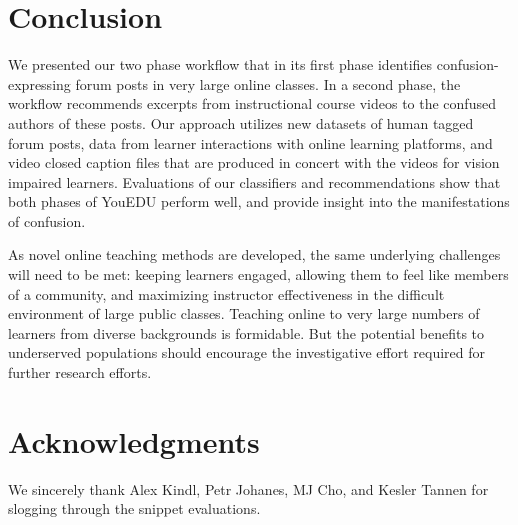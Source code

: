\documentclass{edm_template}
\begin{document}
\section{Conclusion}
\label{sec:conclusion}
We presented our two phase workflow that in its first phase identifies
confusion-expressing forum posts in very large online classes. In a
second phase, the workflow recommends excerpts from instructional course
videos to the confused authors of these posts. Our approach utilizes new datasets
of human tagged forum posts, data from learner interactions with online learning
platforms, and video closed caption files that are produced in concert with the
videos for vision impaired learners. Evaluations of our classifiers and recommendations show that both phases of YouEDU perform well, and provide insight into the
manifestations of confusion.

As novel online teaching methods are developed, the same underlying
challenges will need to be met: keeping learners engaged, allowing
them to feel like members of a community, and maximizing instructor
effectiveness in the difficult environment of large public classes.
Teaching online to very large numbers of learners from diverse backgrounds is formidable.
But the potential benefits to underserved populations should encourage
the investigative effort required for further research efforts.

\section{Acknowledgments}
We sincerely thank Alex Kindl, Petr Johanes, MJ Cho, and Kesler Tannen
for slogging through the snippet evaluations.


\end{document}

